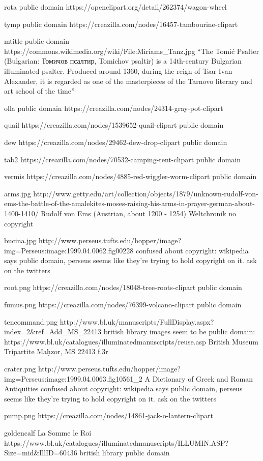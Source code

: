 rota
public domain
https://openclipart.org/detail/262374/wagon-wheel

tymp
public domain
https://creazilla.com/nodes/16457-tambourine-clipart

mtitle
public domain
https://commons.wikimedia.org/wiki/File:Miriams_Tanz.jpg
``The Tomić Psalter (Bulgarian: Томичов псалтир, Tomichov psaltir) is a 14th-century Bulgarian illuminated psalter. Produced around 1360, during the reign of Tsar Ivan Alexander, it is regarded as one of the masterpieces of the Tarnovo literary and art school of the time''

olla
public domain
https://creazilla.com/nodes/24314-gray-pot-clipart

quail
https://creazilla.com/nodes/1539652-quail-clipart
public domain

dew
https://creazilla.com/nodes/29462-dew-drop-clipart
public domain

tab2
https://creazilla.com/nodes/70532-camping-tent-clipart
public domain

vermis
https://creazilla.com/nodes/4885-red-wiggler-worm-clipart
public domain

arms.jpg
http://www.getty.edu/art/collection/objects/1879/unknown-rudolf-von-ems-the-battle-of-the-amalekites-moses-raising-his-arms-in-prayer-german-about-1400-1410/
Rudolf von Ems (Austrian, about 1200 - 1254)
Weltchronik
no copyright

bucina.jpg
http://www.perseus.tufts.edu/hopper/image?img=Perseus:image:1999.04.0062.fig00228
confused about copyright: wikipedia says public domain, perseus seems like they're trying to hold copyright on it.
ask on the twitters

root.png
https://creazilla.com/nodes/18048-tree-roots-clipart
public domain

fumus.png
https://creazilla.com/nodes/76399-volcano-clipart
public domain

tencommand.png
http://www.bl.uk/manuscripts/FullDisplay.aspx?index=2&ref=Add_MS_22413
british library images seem to be public domain: https://www.bl.uk/catalogues/illuminatedmanuscripts/reuse.asp
British Museum Tripartite Maḥzor, MS 22413 f.3r 

crater.png
http://www.perseus.tufts.edu/hopper/image?img=Perseus:image:1999.04.0063.fig10561_2
A Dictionary of Greek and Roman Antiquities
confused about copyright: wikipedia says public domain, perseus seems like they're trying to hold copyright on it.
ask on the twitters

pump.png
https://creazilla.com/nodes/14861-jack-o-lantern-clipart

goldencalf
La Somme le Roi
https://www.bl.uk/catalogues/illuminatedmanuscripts/ILLUMIN.ASP?Size=mid&IllID=60436
british library public domain 
